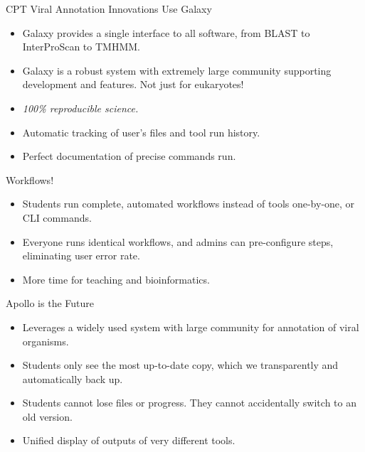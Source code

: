 \documentclass[final,t,20pt]{beamer}
\begin{document}
\begin{frame}[fragile]
\begin{columns}[t]
\begin{column}{.36\linewidth}
            \begin{block}{CPT Viral Annotation Innovations}
                Use Galaxy
                \begin{itemize}
                    \item Galaxy provides a single interface to all software,
                        from BLAST to InterProScan to TMHMM.
                    \item Galaxy is a robust system with extremely large community
                        supporting development and features. Not just for eukaryotes!
                    \item \emph{100\% reproducible science.}
                    \item Automatic tracking of user's files and tool run history.
                    \item Perfect documentation of precise commands run.
                \end{itemize}
                Workflows!
                \begin{itemize}
                    \item Students run complete, automated workflows instead of
                        tools one-by-one, or CLI commands.
                    \item Everyone runs identical workflows, and admins can
                        pre-configure steps, eliminating user error rate.
                    \item More time for teaching and bioinformatics.
                \end{itemize}
                Apollo is the Future
                \begin{itemize}
                    \item Leverages a widely used system with large community
                        for annotation of viral organisms.
                    \item Students only see the most up-to-date copy, which we
                        transparently and automatically back up.
                    \item Students cannot lose files or progress. They cannot
                        accidentally switch to an old version.
                    \item Unified display of outputs of very different tools.
                \end{itemize}
            \end{block}


\end{column}
\end{columns}
\end{frame}
\end{document}
